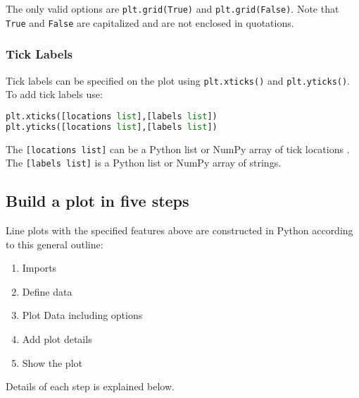 \documentclass{book}
\providecommand{\tightlist}{%
      \setlength{\itemsep}{0pt}\setlength{\parskip}{0pt}}
\newcommand{\passthrough}[1]{#1}
\begin{document}
The only valid options are \passthrough{\lstinline!plt.grid(True)!} and
\passthrough{\lstinline!plt.grid(False)!}. Note that
\passthrough{\lstinline!True!} and \passthrough{\lstinline!False!} are
capitalized and are not enclosed in quotations.
    




    
        \hypertarget{tick-labels}{%
\subsubsection{Tick Labels}\label{tick-labels}}

Tick labels can be specified on the plot using
\passthrough{\lstinline!plt.xticks()!} and
\passthrough{\lstinline!plt.yticks()!}. To add tick labels use:

\begin{lstlisting}[language=Python]
plt.xticks([locations list],[labels list])
plt.yticks([locations list],[labels list])
\end{lstlisting}

The \passthrough{\lstinline![locations list]!} can be a Python list or
NumPy array of tick locations . The
\passthrough{\lstinline![labels list]!} is a Python list or NumPy array
of strings.
    




    
        \hypertarget{build-a-plot-in-five-steps}{%
\subsection{Build a plot in five
steps}\label{build-a-plot-in-five-steps}}
    




    
        Line plots with the specified features above are constructed in Python
according to this general outline:

\begin{enumerate}
\def\labelenumi{\arabic{enumi}.}
\tightlist
\item
  Imports
\item
  Define data
\item
  Plot Data including options
\item
  Add plot details
\item
  Show the plot
\end{enumerate}

Details of each step is explained below.
\end{document}
